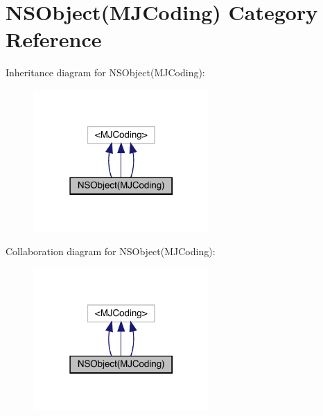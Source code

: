 \hypertarget{category_n_s_object_07_m_j_coding_08}{}\section{N\+S\+Object(M\+J\+Coding) Category Reference}
\label{category_n_s_object_07_m_j_coding_08}


Inheritance diagram for N\+S\+Object(M\+J\+Coding)\+:\nopagebreak
\begin{figure}[H]
\begin{center}
\leavevmode
\includegraphics[width=190pt]{category_n_s_object_07_m_j_coding_08__inherit__graph}
\end{center}
\end{figure}


Collaboration diagram for N\+S\+Object(M\+J\+Coding)\+:\nopagebreak
\begin{figure}[H]
\begin{center}
\leavevmode
\includegraphics[width=190pt]{category_n_s_object_07_m_j_coding_08__coll__graph}
\end{center}
\end{figure}
